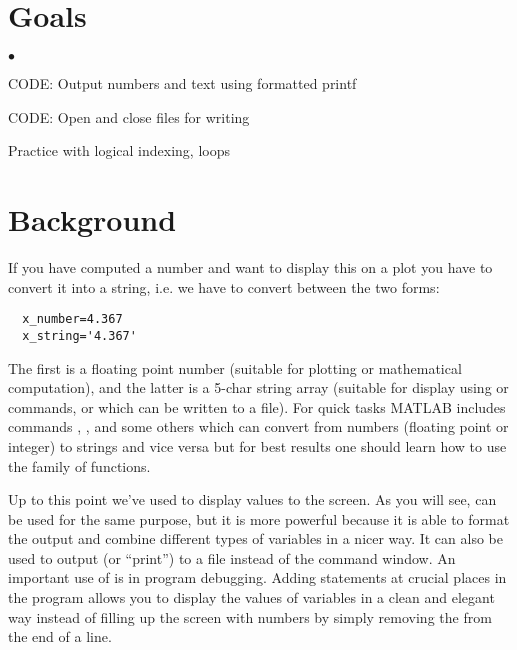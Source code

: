 \documentclass[letterpaper]{article}
\newcounter{lnum}
\newenvironment{abbrevlist}%
  {\begin{list}{$\bullet$}{\setlength{\leftmargin}{2em}%
               \setlength{\itemindent}{0em}%
               \setlength{\itemsep}{0pt}%
               \setlength{\parsep}{0pt}%
               \setlength{\topsep}{2pt}%
               \usecounter{lnum} } }{\end{list}}
\begin{document}
\section{Goals}
\begin{abbrevlist}
\item CODE: Output numbers and text using formatted printf 
\item CODE: Open and close files for writing
\item Practice with logical indexing, loops
\end{abbrevlist}

\section{Background}

If you have computed a number and want to display this on a plot you have to convert it into
a string, i.e. we have to convert between the two forms:
\begin{lstlisting}
  x_number=4.367          
  x_string='4.367'
\end{lstlisting}
The first is a floating point number (suitable for plotting or mathematical computation), 
and the latter is a 5-char string array (suitable for display using  or 
commands, or which can be written to a file). For quick tasks MATLAB includes commands , , 
and some others which can convert from numbers (floating point or integer) to strings and
vice versa but for best results one should learn how to use the  family
of functions. 


Up to this point we've used  to display values to the screen. 
As you will see,  can be used for the same purpose, but it is more powerful because it is able to 
format the output and combine different types of variables in a nicer way. It can also be used to output (or ``print'') to a file instead of the command window.
An important use of   is in program debugging. Adding
 statements at crucial places in the program allows you to display the
values of variables in a clean and elegant way instead of filling up the screen with numbers
by simply removing the \mcode{;} from the end of a line.
\end{document}
